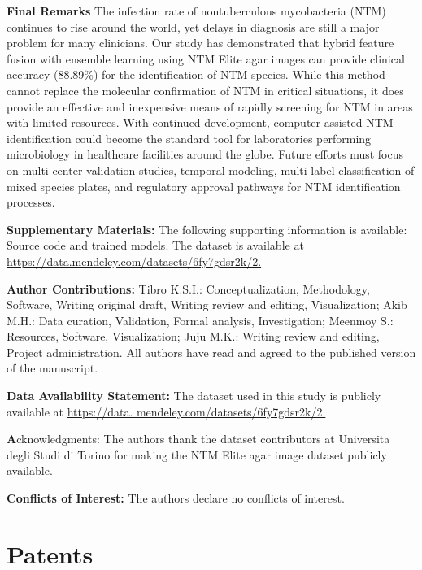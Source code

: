 \documentclass[journal,article,submit,pdftex,moreauthors]{Definitions/mdpi}
\begin{document}
\textbf{Final Remarks} 
The infection rate of nontuberculous mycobacteria (NTM) continues to rise around the 
world, yet delays in diagnosis are still a major problem for many clinicians. Our study 
has demonstrated that hybrid feature fusion with ensemble learning using NTM Elite 
agar images can provide clinical accuracy (88.89\%) for the identification of NTM 
species. While this method cannot replace the molecular confirmation of NTM in critical 
situations, it does provide an effective and inexpensive means of rapidly screening for 
NTM in areas with limited resources. 
With continued development, computer-assisted NTM identification could become the 
standard tool for laboratories performing microbiology in healthcare facilities around the 
globe. Future efforts must focus on multi-center validation studies, temporal modeling, 
multi-label classification of mixed species plates, and regulatory approval pathways for 
NTM identification processes. 

\textbf{Supplementary Materials:} The following supporting information is available: Source 
code and  trained models. The dataset is available at \url{https://data.mendeley.com/datasets/6fy7gdsr2k/2.} 

\textbf{Author Contributions:} Tibro K.S.I.: Conceptualization, Methodology, Software, 
Writing original  draft, Writing review and editing, Visualization; Akib M.H.: Data 
curation, Validation, Formal  analysis, Investigation; Meenmoy S.: Resources, Software, 
Visualization; Juju M.K.: Writing review  and editing, Project administration. All authors 
have read and agreed to the published version of the manuscript.  

\textbf{Data Availability Statement:} The dataset used in this study is publicly available at 
\url{https://data.  mendeley.com/datasets/6fy7gdsr2k/2.} 

\textbf Acknowledgments: The authors thank the dataset contributors at Universita degli 
Studi di Torino  for making the NTM Elite agar image dataset publicly available.  

\textbf{Conflicts of Interest:} The authors declare no conflicts of interest. 

\section{Patents}

\vspace{6pt} 
\end{document}
